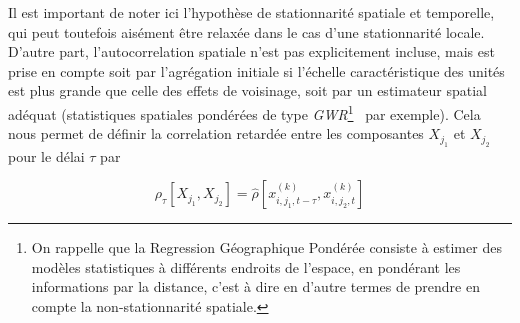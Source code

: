 {Il est important de noter ici l'hypothèse de stationnarité spatiale et temporelle, qui peut toutefois aisément être relaxée dans le cas d'une stationnarité locale. D'autre part, l'autocorrelation spatiale n'est pas explicitement incluse, mais est prise en compte soit par l'agrégation initiale si l'échelle caractéristique des unités est plus grande que celle des effets de voisinage, soit par un estimateur spatial adéquat (statistiques spatiales pondérées de type \emph{GWR}\footnote{On rappelle que la Regression Géographique Pondérée consiste à estimer des modèles statistiques à différents endroits de l'espace, en pondérant les informations par la distance, c'est à dire en d'autre termes de prendre en compte la non-stationnarité spatiale.}~\cite{brunsdon1998geographically} par exemple). Cela nous permet de définir la correlation retardée entre les composantes $X_{j_1}$ et $X_{j_2}$ pour le délai $\tau$ par
}


\begin{equation}
\rho_{\tau}\left[X_{j_1},X_{j_2}\right] = \hat{\rho}\left[x^{(k)}_{i,j_1,t - \tau},x^{(k)}_{i,j_2,t}\right]
\end{equation}



